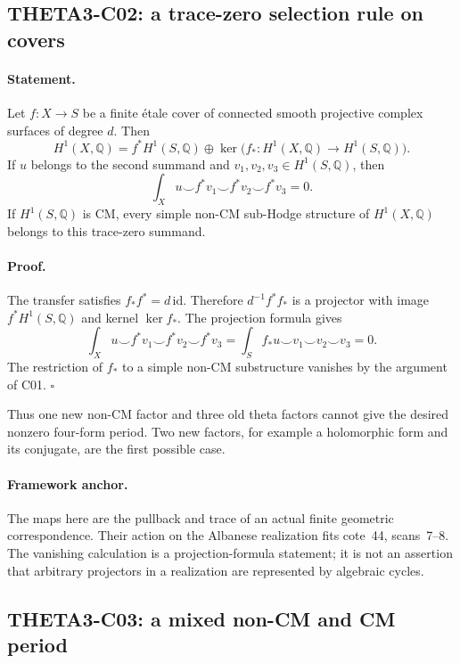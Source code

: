 \documentclass[11pt]{article}
\newcommand{\Q}{\mathbb Q}\newcommand{\C}{\mathbb C}\newcommand{\Z}{\mathbb Z}\newcommand{\R}{\mathbb R}\newcommand{\A}{\mathbb A}\newcommand{\OO}{\mathcal O}
\theoremstyle{definition}\newtheorem{definition}[theorem]{Definition}\newtheorem{remark}[theorem]{Remark}
\begin{document}
\subsection{THETA3-C02: a trace-zero selection rule on covers}\label{C02}

\paragraph{Statement.}
Let $f:X\to S$ be a finite \'etale cover of connected smooth
projective complex surfaces of degree $d$. Then
\[
 H^1(X,\Q)=f^*H^1(S,\Q)\oplus
       \ker\bigl(f_*:H^1(X,\Q)\to H^1(S,\Q)\bigr).
\]
If $u$ belongs to the second summand and $v_1,v_2,v_3\in H^1(S,\Q)$,
then
\[
 \int_Xu\smile f^*v_1\smile f^*v_2\smile f^*v_3=0.
\]
If $H^1(S,\Q)$ is CM, every simple non-CM sub-Hodge structure of
$H^1(X,\Q)$ belongs to this trace-zero summand.

\paragraph{Proof.}
The transfer satisfies $f_*f^*=d\,\mathrm{id}$. Therefore
$d^{-1}f^*f_*$ is a projector with image $f^*H^1(S,\Q)$ and kernel
$\ker f_*$. The projection formula gives
\[
 \int_Xu\smile f^*v_1\smile f^*v_2\smile f^*v_3
 =\int_S f_*u\smile v_1\smile v_2\smile v_3=0.
\]
The restriction of $f_*$ to a simple non-CM substructure vanishes by
the argument of C01. $\square$

Thus one new non-CM factor and three old theta factors cannot give
the desired nonzero four-form period. Two new factors, for example a
holomorphic form and its conjugate, are the first possible case.

\paragraph{Framework anchor.}
The maps here are the pullback and trace of an actual finite geometric
correspondence.  Their action on the Albanese realization fits cote~44,
scans~7--8.  The vanishing calculation is a projection-formula statement;
it is not an assertion that arbitrary projectors in a realization are
represented by algebraic cycles.

\subsection{THETA3-C03: a mixed non-CM and CM period}\label{C03}
\end{document}
